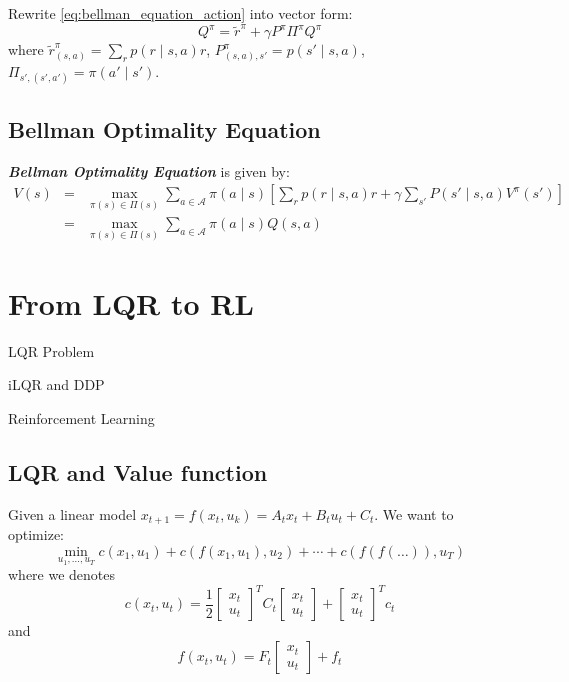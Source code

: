 \documentclass[10pt]{elegantbook}
\newcommand{\mydefination}[1]{\textbf{\textit{\textcolor{structurecolor}{#1}}}}
\begin{document}
Rewrite \ref{eq:bellman_equation_action} into vector form:
\begin{equation}
    Q^{\pi} = \tilde r^{\pi} + \gamma P^{\pi} \Pi^{\pi} Q^{\pi}
\end{equation}
where $\tilde r^{\pi}_{(s,a)} = \sum_r p(r \mid s, a)r$, 
$P^{\pi}_{(s, a), s'} = p(s' \mid s, a)$, $\Pi_{s', (s', a')} = \pi(a' \mid s')$.

\section{Bellman Optimality Equation}
\mydefination{Bellman Optimality Equation} is given by:
\begin{equation}
    \begin{array}{lll}
    V(s) &=& \max_{\pi(s) \in \Pi(s)} \sum_{a \in \mathcal A}\pi(a\mid s) \left [ \sum_r p(r \mid s, a) r + \gamma \sum_{s'}P(s' \mid s, a)V^{\pi}(s') \right ] \\
         &=& \max_{\pi(s) \in \Pi(s)} \sum_{a \in \mathcal A}\pi(a\mid s) Q(s, a)
    \end{array}
\end{equation}

\chapter{From LQR to RL}

\begin{introduction}
    \item LQR Problem
    \item iLQR and DDP
    \item Reinforcement Learning
\end{introduction}

\section{LQR and Value function}

Given a linear model $x_{t+1} = f(x_t, u_k) = A_t x_t + B_t u_t + C_t$. We want to optimize:
\[ \min_{u_1, \ldots, u_T} c(x_1, u_1) + c(f(x_1, u_1), u_2) + \cdots + c(f(f(\ldots)), u_T) \]
where we denotes 
\[ c(x_t, u_t) = \frac{1}{2} 
\begin{bmatrix}
    x_t \\ 
    u_t
\end{bmatrix}^T C_t 
\begin{bmatrix}
    x_t \\ 
    u_t
\end{bmatrix}
+
\begin{bmatrix}
    x_t \\ 
    u_t
\end{bmatrix}^T c_t
\]
and 
\[ f(x_t, u_t) 
= F_t
\begin{bmatrix}
    x_t \\ 
    u_t
\end{bmatrix}
+ f_t
\]
\end{document}
